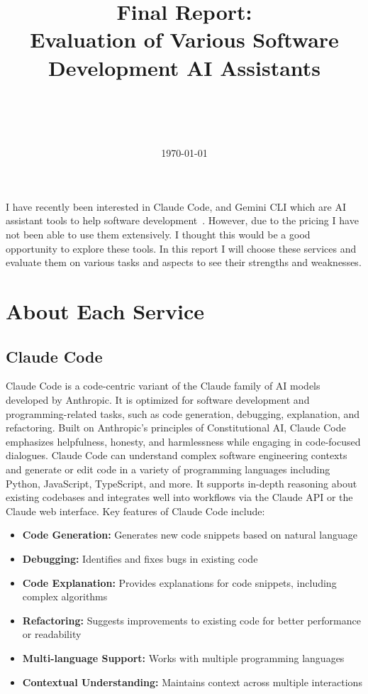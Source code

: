 \documentclass[10pt]{article}
\title{\textbf{Final Report:\\Evaluation of Various Software Development AI Assistants}}
\author{
    \makebox[\textwidth][c]{\textbf{Luna Sugiyama}} \\
    \makebox[\textwidth][c]{Graduate School of Information Science and Technology} \\
    \makebox[\textwidth][c]{Information and Communication Engineering} \\
    \makebox[\textwidth][c]{\texttt{lunagracesugiyama@g.ecc.u-tokyo.ac.jp}}
}
\date{\today}
\begin{document}
\maketitle
\thispagestyle{fancy}
I have recently been interested in Claude Code, and Gemini CLI which are AI assistant tools to help software development~\cite{vibecoding}.
However, due to the pricing I have not been able to use them extensively.
I thought this would be a good opportunity to explore these tools.
In this report I will choose these services and evaluate them on various tasks and aspects to see their strengths and weaknesses.

\section{About Each Service}
\subsection{Claude Code}
Claude Code is a code-centric variant of the Claude family of AI models developed by Anthropic. It is optimized for software development and programming-related tasks, such as code generation, debugging, explanation, and refactoring. Built on Anthropic's principles of Constitutional AI, Claude Code emphasizes helpfulness, honesty, and harmlessness while engaging in code-focused dialogues.
Claude Code can understand complex software engineering contexts and generate or edit code in a variety of programming languages including Python, JavaScript, TypeScript, and more. It supports in-depth reasoning about existing codebases and integrates well into workflows via the Claude API or the Claude web interface.
Key features of Claude Code include:
\begin{itemize}
    \item \textbf{Code Generation:} Generates new code snippets based on natural language
    \item \textbf{Debugging:} Identifies and fixes bugs in existing code
    \item \textbf{Code Explanation:} Provides explanations for code snippets, including complex algorithms
    \item \textbf{Refactoring:} Suggests improvements to existing code for better performance or readability
    \item \textbf{Multi-language Support:} Works with multiple programming languages
    \item \textbf{Contextual Understanding:} Maintains context across multiple interactions
\end{itemize}
\end{document}
